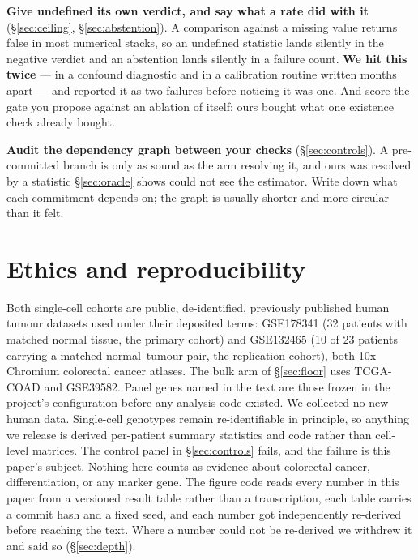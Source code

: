 \documentclass{article}
\begin{document}
\textbf{Give undefined its own verdict, and say what a rate did with it}
(\S\ref{sec:ceiling}, \S\ref{sec:abstention}). A comparison against a missing
value returns false in most numerical stacks, so an undefined statistic lands
silently in the negative verdict and an abstention lands silently in a failure
count. \textbf{We hit this twice} --- in a confound diagnostic and in a
calibration routine written months apart --- and reported it as two failures
before noticing it was one. And score the gate you propose against an ablation of
itself: ours bought what one existence check already bought.

\textbf{Audit the dependency graph between your checks} (\S\ref{sec:controls}).
A pre-committed branch is only as sound as the arm resolving it, and ours was
resolved by a statistic \S\ref{sec:oracle} shows could not see the estimator.
Write down what each commitment depends on; the graph is usually shorter and more
circular than it felt.





\section*{Ethics and reproducibility}

Both single-cell cohorts are public, de-identified, previously published human
tumour datasets used under their deposited terms: GSE178341 (32 patients with
matched normal tissue, the primary cohort) and GSE132465 (10 of 23 patients
carrying a matched normal--tumour pair, the replication cohort), both 10x
Chromium colorectal cancer atlases. The bulk arm of \S\ref{sec:floor} uses
TCGA-COAD and GSE39582. Panel genes named in the text are those frozen in the
project's configuration before any analysis code existed. We collected no new
human data. Single-cell genotypes remain re-identifiable in principle, so
anything we release is derived per-patient summary statistics and code rather
than cell-level matrices. The control panel in \S\ref{sec:controls} fails, and
the failure is this paper's subject. Nothing here counts as evidence about
colorectal cancer, differentiation, or any marker gene. The figure code reads
every number in this paper from a versioned result table rather than a
transcription, each table carries a commit hash and a fixed seed, and each
number got independently re-derived before reaching the text. Where a number
could not be re-derived we withdrew it and said so (\S\ref{sec:depth}).



\clearpage
\appendix

\end{document}
